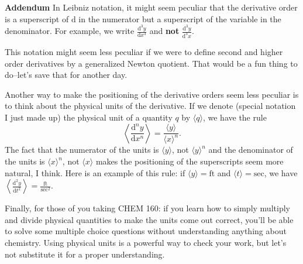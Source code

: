 \documentclass[12pt,fleqn]{exam}
\begin{document}
\vfill 
\noindent \textbf{Addendum} In Leibniz notation, it might seem peculiar that the derivative
order is a superscript of $\mathrm{d}$ in the numerator but a
superscript of the variable in the denominator. For example,
we write 
\(\displaystyle \frac{\mathrm{d}^3 y}{\mathrm{d}x^3}\) and
\textbf{ not } 
\(\displaystyle \frac{\mathrm{d}^3 y}{\mathrm{d}^3 x}\). 

This
notation might seem less peculiar if we were to define second and
higher order derivatives by a generalized Newton quotient. That 
would be a fun thing to do--let's save that for another day.

Another way to make the positioning of the derivative orders
seem less peculiar is to think about the physical units of 
the derivative. If we denote (special notation I just made up)
the physical unit of a quantity $q$ by $\langle q \rangle$, we 
have the rule
\[
    \left \langle \frac{\mathrm{d}^n y}{\mathrm{d} x^n} \right \rangle
    = \frac{ \langle y \rangle}{ \langle x \rangle^n }.
\]
The fact that the numerator of the units is \(\langle y \rangle\),
not \(\langle y \rangle^n\) and the denominator of the units is 
\(\langle x \rangle^n\), not \(\langle x \rangle\) makes the 
positioning of the superscripts seem more natural, I think.
Here is an example of this rule: if $\langle y \rangle = \mbox{ft}$ 
and \(\langle t \rangle = \mbox{sec}\), we have
\(\left \langle \frac{\mathrm{d}^2 y}{\mathrm{d} t^2} \right \rangle
    = \frac{ \mbox{ft}}{\mbox{sec}^2 }\).

Finally, for those of you taking CHEM 160: if you learn
how to simply multiply and divide physical quantities to
make the units come out correct, you'll be able to solve 
some multiple choice questions without understanding 
anything about chemistry. Using physical units is a
powerful way to check your work, but let's not substitute
it for a proper understanding.
\end{document}
